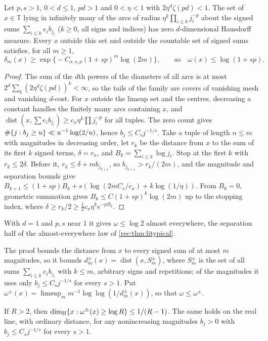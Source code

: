 \begin{lemma}\label{li:lem:separation}
Let $p,s>1$, $0<d\le1$, $pd>1$ and $0<\eta<1$ with $2\eta^d\zeta(pd)<1$. The set of $x\in\mathbb T$ lying in
infinitely many of the arcs of radius $\eta^k\prod_{i\le k}j_i^{-p}$ about the signed sums $\sum_{i\le k}e_ib_{j_i}$
($k\ge0$, all signs and indices) has zero $d$-dimensional Hausdorff measure. Every $x$ outside this set and
outside the countable set of signed sums satisfies, for all $m\ge1$,
\[
 \delta_m(x)\ge\exp\bigl\{-C_{x,s,p}(1+sp)^m\log(2m)\bigr\},\qquad\text{so}\quad\omega(x)\le\log(1+sp).
\]
\end{lemma}

\begin{proof}
The sum of the $d$th powers of the diameters of all arcs is at most $2^d\sum_k(2\eta^d\zeta(pd))^k<\infty$, so the
tails of the family are covers of vanishing mesh and vanishing $d$-cost. For $x$ outside the limsup set
and the centres, decreasing a constant handles the finitely many arcs containing $x$, and
$\operatorname{dist}(x,\sum e_ib_{j_i})\ge c_x\eta^k\prod j_i^{-p}$ for all tuples. The zero count gives
$\#\{j:b_j\ge u\}\ll u^{-1}\log(2/u)$, hence $b_j\le C_sj^{-1/s}$. Take a tuple of length $n\le m$ with magnitudes
in decreasing order, let $r_k$ be the distance from $x$ to the sum of its first $k$ signed terms,
$\delta=r_n$, and $B_k=\sum_{i\le k}\log j_i$. Stop at the first $k$ with $r_k\le2\delta$. Before it,
$r_k\le\delta+mb_{j_{k+1}}$, so $b_{j_{k+1}}>r_k/(2m)$, and the magnitude and separation bounds give
$B_{k+1}\le(1+sp)B_k+s(\log(2mC_s/c_x)+k\log(1/\eta))$. From $B_0=0$, geometric summation gives
$B_k\le C(1+sp)^k\log(2m)$ up to the stopping index, where $\delta\ge r_k/2\ge\frac12c_x\eta^k e^{-pB_k}$.
\end{proof}

With $d=1$ and $p,s$ near $1$ it gives $\omega\le\log2$ almost everywhere, the separation half of the almost-everywhere law of \cref{rec:thm:litypical}.

The proof bounds the distance from $x$ to every signed sum of at most $m$ magnitudes, so it bounds
$d_m^\pm(x)=\operatorname{dist}(x,S_m^\pm)$, where $S_m^\pm$ is the set of all sums $\sum_{i\le k}e_ib_{j_i}$ with $k\le m$,
arbitrary signs and repetitions; of the magnitudes it uses only $b_j\le C_sj^{-1/s}$ for every $s>1$. Put
$\omega^\pm(x)=\limsup_m m^{-1}\log\log(1/d_m^\pm(x))$, so that $\omega\le\omega^\pm$.

\begin{corollary}\label{lih:cor:cover}
If $R>2$, then $\dim_{\mathrm H}\{x:\omega^\pm(x)\ge\log R\}\le1/(R-1)$. The same holds on the real line, with
ordinary distance, for any nonincreasing magnitudes $b_j>0$ with $b_j\le C_sj^{-1/s}$ for every $s>1$.
\end{corollary}

